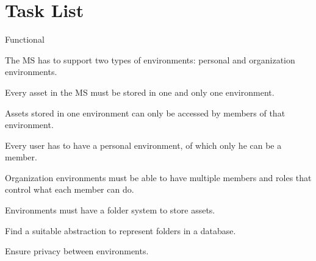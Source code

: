 
\chapter{Task List}
\label{cha:tasklist}



\begin{myEnumerate}
  \item Functional
    \begin{myEnumerate}
      \item The MS has to support two types of environments: personal and organization environments.
        \begin{myEnumerate}
          \item Every asset in the MS must be stored in one and only one environment.

          \item Assets stored in one environment can only be accessed by members of that
            environment.

          \item Every user has to have a personal environment, of which only he can be a member.

          \item Organization environments must be able to have multiple members and roles that control what each member can do.

          \item Environments must have a folder system to store assets.
            \begin{myEnumerate}
              \item Find a suitable abstraction to represent folders in a database.

              \item Ensure privacy between environments.



\end{myEnumerate}
\end{myEnumerate}
\end{myEnumerate}
\end{myEnumerate}
